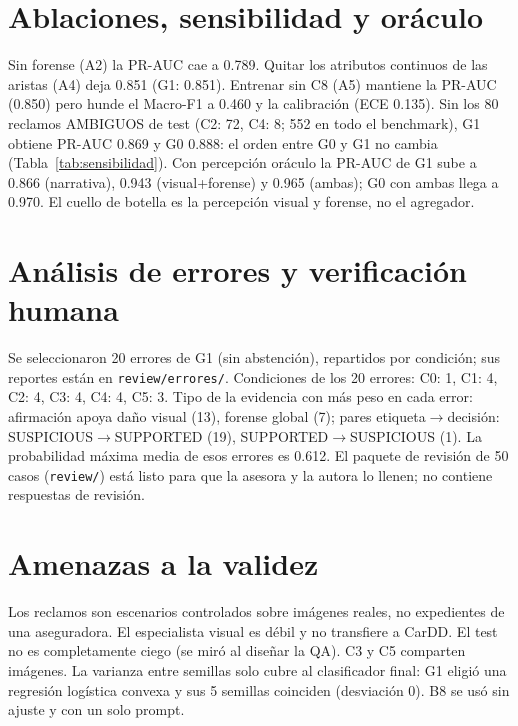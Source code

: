 \section{Ablaciones, sensibilidad y oráculo}

Sin forense (A2) la PR-AUC cae a 0.789. Quitar los atributos continuos de las aristas (A4) deja
0.851 (G1: 0.851). Entrenar sin C8 (A5) mantiene la PR-AUC
(0.850) pero hunde el Macro-F1 a 0.460 y la calibración (ECE 0.135).
Sin los 80 reclamos AMBIGUOS de test (C2: 72, C4: 8; 552 en todo el benchmark), G1 obtiene PR-AUC 0.869
y G0 0.888: el orden entre G0 y G1 no cambia (Tabla~\ref{tab:sensibilidad}).
Con percepción oráculo la PR-AUC de G1 sube a 0.866 (narrativa),
0.943 (visual+forense) y 0.965 (ambas); G0 con ambas
llega a 0.970. El cuello de botella es la percepción visual y forense, no el agregador.

\section{Análisis de errores y verificación humana}

Se seleccionaron 20 errores de G1 (sin abstención), repartidos por condición; sus reportes están en
\texttt{review/errores/}. Condiciones de los 20 errores: C0: 1, C1: 4, C2: 4, C3: 4, C4: 4, C5: 3. Tipo de la evidencia con más peso en cada error:
afirmación apoya daño visual (13), forense global (7); pares etiqueta$\to$decisión: SUSPICIOUS$\to$SUPPORTED (19), SUPPORTED$\to$SUSPICIOUS (1). La probabilidad máxima media de esos errores es 0.612. El paquete de
revisión de 50 casos (\texttt{review/}) está listo para que la asesora y la autora lo llenen; no contiene respuestas de
revisión.

\section{Amenazas a la validez}

Los reclamos son escenarios controlados sobre imágenes reales, no expedientes de una aseguradora. El especialista visual es
débil y no transfiere a CarDD. El test no es completamente ciego (se miró al diseñar la QA). C3 y C5 comparten imágenes. La
varianza entre semillas solo cubre al clasificador final: G1 eligió una regresión logística convexa y sus 5 semillas coinciden
(desviación 0). B8 se usó sin ajuste y con un solo prompt.
